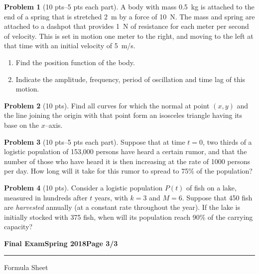 \documentclass[12pt]{article}
\theoremstyle{definition}
\newtheorem{problem}{Problem}
\begin{document}
\begin{problem}[10 pts--5 pts each part]
A body with mass 0.5~kg is attached to the end of a spring that is stretched 2~m by a force of 10~N.  The mass and spring are attached to a dashpot that provides 1~N of resistance for each meter per second of velocity.  This is set in motion one meter to the right, and moving to the left at that time with an initial velocity of 5~m/s.
\begin{enumerate}
  \item Find the position function of the body.
  \item Indicate the amplitude, frequency, period of oscillation and time lag of this motion.
\end{enumerate}
\end{problem}

\begin{problem}[10 pts]
Find all curves for which the normal at point $(x,y)$ and the line joining the origin with that point form an isosceles triangle having its base on the $x$--axis.
\end{problem}

\begin{problem}[10 pts--5 pts each part]
Suppose that at time $t=0$, two thirds of a logistic population of 153,000 persons have heard a certain rumor, and that the number of those who have heard it is then increasing­ at the rate of 1000 persons per day. How long will it take for this rumor to spread to 75\% of the population?
\end{problem}

\begin{problem}[10 pts]
Consider a logistic population $P(t)$ of fish on a lake, measured in hundreds after $t$ years, with $k=3$ and $M=6$.  Suppose that 450 fish are \emph{harvested} annually (at a constant rate throughout the year).  If the lake is initially stocked with 375 fish, when will its population reach 90\% of the carrying capacity?
\end{problem}

\newpage

\hfill{\large\bf Final Exam}\hfill{\large\bf Spring 2018}\hfill{\large\bf Page 3/3}\hrule

\bigskip
{\Large Formula Sheet}
\end{document}
